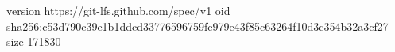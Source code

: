 version https://git-lfs.github.com/spec/v1
oid sha256:c53d790c39e1b1ddcd33776596759fc979e43f85c63264f10d3c354b32a3cf27
size 171830
